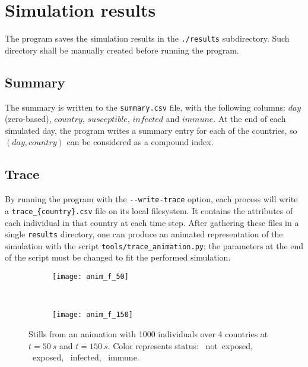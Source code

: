 \section{Simulation results}
\label{sec:sim_res}

The program saves the simulation results in the \texttt{./results} subdirectory. Such directory shall be manually created before running the program.

\subsection{Summary}
The summary is written to the \texttt{summary.csv} file, with the following columns: $day$ (zero-based), $country$, $susceptible$, $infected$ and $immune$.
At the end of each simulated day, the program writes a summary entry for each of the countries, so $(day, country)$ can be considered as a compound index.

\subsection{Trace}
By running the program with the \verb!--write-trace! option, each process will write a \texttt{trace\_\{country\}.csv} file on its local filesystem. It contains the attributes of each individual in that country at each time step.
After gathering these files in a single \texttt{results} directory, one can produce an animated representation of the simulation with the script \texttt{tools/trace\_animation.py}; the parameters at the end of the script must be changed to fit the performed simulation.

\begin{figure}[hb]
    \begin{subfigure}[c]{0.49\textwidth}
        \texttt{[image: anim\_f\_50]}
    \end{subfigure}
    ~
    \begin{subfigure}[c]{0.49\textwidth}
        \texttt{[image: anim\_f\_150]}
    \end{subfigure}
    \caption{Stills from an animation with 1000 individuals over 4 countries at $t=\SI{50}{s}$ and $t=\SI{150}{s}$. Color represents status:
    \textcolor{plt:green}{\circmark}~not~exposed,
    \textcolor{plt:yellow}{\circmark}~exposed,
    \textcolor{plt:red}{\circmark}~infected,
    \textcolor{plt:blue}{\circmark}~immune.
    }
    \label{fig:animation}
\end{figure}